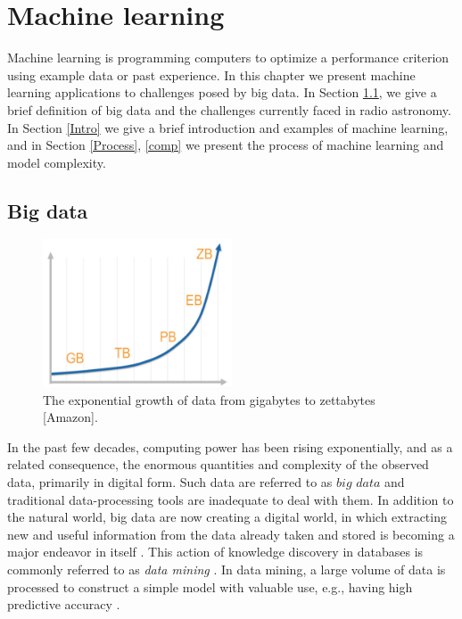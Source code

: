 
\chapter{Machine learning}
Machine learning is programming computers to optimize a performance
criterion using example data or past experience. In this chapter we present machine learning applications to challenges posed by big data. In Section \ref{BigD}, we give a brief definition of big data  and the challenges currently faced in radio astronomy. In Section \ref{Intro} we give a brief introduction and examples of machine learning,  and in Section \ref{Process}, \ref{comp} we  present the process of machine learning and model complexity.
\section{Big data}
\label{BigD}
\begin{figure}[H]
  \centering
    \includegraphics[width=0.5\textwidth]{images/Expgrowth.png}
    \caption{The exponential growth of data from gigabytes to zettabytes [Amazon].}
  \label{datagrowth.png}
\end{figure}

In the past few decades, computing power has been rising exponentially, 
and as a related consequence, the enormous quantities and complexity of the observed data, primarily in digital form. Such data are referred to as $\textit{big data}$ and traditional data-processing tools are inadequate to deal with them. In addition to the natural world, big data are now creating a digital world, in which extracting new and useful information from the data already taken and stored is becoming a major endeavor in itself \citep{ball2010data}. This action of knowledge discovery in databases is commonly referred to as \textit{data mining} \citep{ball2010data}. In data mining, a large volume
of data is processed to construct a simple model with valuable use, e.g., having high predictive accuracy  \citep{alpaydin2014introduction}.



